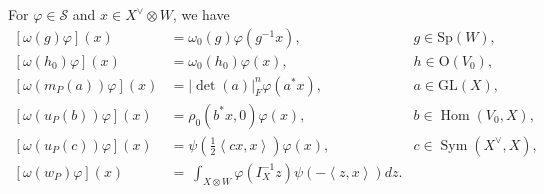 \documentclass[article]{article}
\numberwithin{equation}{section}
\theoremstyle{definition}
\begin{document}
For $\varphi\in  \mathscr{S}$ and $x\in X^\vee\otimes W$, we have 
\begin{align*}
\left[\omega(g) \varphi\right]\left(x \right)&= \omega_0(g)\varphi(g^{-1}x),  & g \in \mathrm{Sp}(W) , \\
\left[\omega(h_0) \varphi\right](x) & =\omega_0(h_0)\varphi(x), & {h \in \mathrm{O}\left(V_0\right)}, \\ 
{\left[\omega\left(m_{P}\left(a\right)\right) \varphi\right]\left(x\right)} & =\left|\operatorname{det}\left(a\right)\right|_{F}^{n} \varphi(a^{ *}x), & {a \in \mathrm{GL}(X)},\\
{\left[\omega\left(u_{P}\left(b\right)\right) \varphi\right]\left(x \right)}& =\rho_{0}\left(b^{ *} x, 0\right) \varphi\left(x\right),  & {b \in \operatorname{Hom}(V_0, X)}, \\ \left[\omega\left(u_{P}\left(c\right)\right) \varphi\right]\left(x\right) & =\psi\left(\frac{1}{2}\left\langle c x, x\right\rangle\right) \varphi\left(x\right) , & c \in \operatorname{Sym}\left(X^\vee, X\right),\\
\left[\omega\left(w_{P}\right) \varphi\right]\left(x \right)&=\ \int_{X\otimes W } \varphi\left(I_{X}^{-1} z\right) \psi\left(-\left\langle z, x\right\rangle\right) d z. 
 \end{align*}





\end{document}
